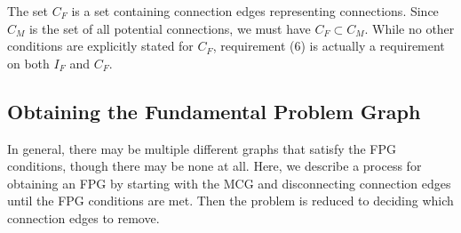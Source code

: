 	The set $C_F$ is a set containing connection edges representing connections. Since $C_M$ is the set of all potential connections, we must have $C_F \subset C_M$. While no other conditions are explicitly stated for $C_F$, requirement (6) is actually a requirement on both $I_F$ and $C_F$.

\subsection{Obtaining the Fundamental Problem Graph}
	\label{ss:obtaining FPG}
	In general, there may be multiple different graphs that satisfy the FPG conditions, though there may be none at all. Here, we describe a process for obtaining an FPG by starting with the MCG and disconnecting connection edges until the FPG conditions are met. Then the problem is reduced to deciding which connection edges to remove.


